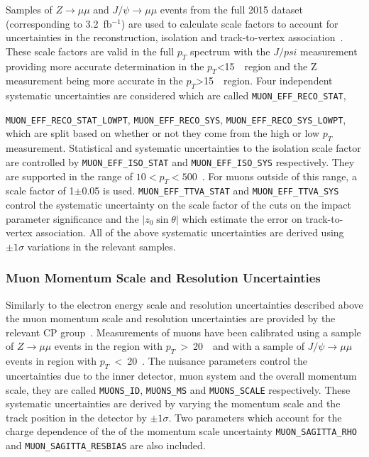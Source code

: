 Samples of $Z \to \mu\mu$ and $J/\psi \to \mu\mu$ events from the full 2015
dataset (corresponding to 3.2~fb$^{-1}$) are used to calculate scale factors to
account for uncertainties in the reconstruction, isolation and track-to-vertex
association~\cite{muonTWiki}. These scale factors are valid in the full $p_T$
spectrum with the $J/psi$ measurement providing more accurate determination in
the $p_T$<15~\GeV\ region and the Z measurement being more accurate in the
$p_T$>15~\GeV\ region. Four independent systematic uncertainties are considered
which are called \texttt{MUON\_EFF\_RECO\_STAT},

\texttt{MUON\_EFF\_RECO\_STAT\_LOWPT}, \texttt{MUON\_EFF\_RECO\_SYS},
\texttt{MUON\_EFF\_RECO\_SYS\_LOWPT}, which are split based on whether or not
they come from the high or low $p_T$ measurement. Statistical and systematic
uncertainties to the isolation scale factor are controlled by
\texttt{MUON\_EFF\_ISO\_STAT} and \texttt{MUON\_EFF\_ISO\_SYS} respectively.
They are supported in the range of $10 < p_T < 500$~\GeV. For muons outside of
this range, a scale factor of 1$\pm$0.05 is used.
\texttt{MUON\_EFF\_TTVA\_STAT} and \texttt{MUON\_EFF\_TTVA\_SYS} control the
systematic uncertainty on the scale factor of the cuts on the impact parameter
significance and the $|z_0\sin\theta|$ which estimate the error on
track-to-vertex association. All of the above systematic uncertainties are
derived using $\pm 1\sigma$ variations in the relevant samples.

\subsubsection{Muon Momentum Scale and Resolution Uncertainties}

Similarly to the electron energy scale and resolution uncertainties described
above the muon momentum scale and resolution uncertainties are provided by the
relevant CP group~\cite{muonTWiki}. Measurements of muons have been calibrated
using a sample of  $Z\rightarrow \mu\mu$ events in the region with
$p_T$~>~20~\GeV\ and with a sample of $J/\psi\rightarrow \mu\mu$ events in region
with $p_T$~<~20~\GeV. The nuisance parameters control the uncertainties due to
the inner detector, muon system and the overall momentum scale, they are called
\texttt{MUONS\_ID}, \texttt{MUONS\_MS} and \texttt{MUONS\_SCALE} respectively.
These systematic uncertainties are derived by varying the momentum scale and the
track position in the detector by $\pm 1\sigma$. Two parameters which account
for the charge dependence of the of the momentum scale uncertainty
\texttt{MUON\_SAGITTA\_RHO} and \texttt{MUON\_SAGITTA\_RESBIAS} are also included.

